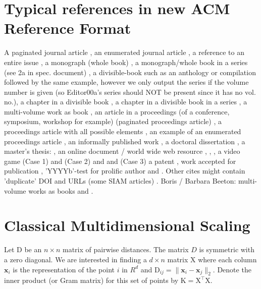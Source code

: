 \documentclass{acmtog} %
\begin{document}

\section{Typical references in new ACM Reference Format}
A paginated journal article \cite{Abril07}, an enumerated
journal article \cite{Cohen07}, a reference to an entire issue \cite{JCohen96},
a monograph (whole book) \cite{Kosiur01}, a monograph/whole book in a series (see 2a in spec. document)
\cite{Harel79}, a divisible-book such as an anthology or compilation \cite{Editor00}
followed by the same example, however we only output the series if the volume number is given
\cite{Editor00a} (so Editor00a's series should NOT be present since it has no vol. no.),
a chapter in a divisible book \cite{Spector90}, a chapter in a divisible book
in a series \cite{Douglass98}, a multi-volume work as book \cite{Knuth97},
an article in a proceedings (of a conference, symposium, workshop for example)
(paginated proceedings article) \cite{Andler79}, a proceedings article
with all possible elements \cite{Smith10}, an example of an enumerated
proceedings article \cite{VanGundy07},
an informally published work \cite{Harel78}, a doctoral dissertation \cite{Clarkson85},
a master's thesis: \cite{anisi03}, an online document / world wide web resource \cite{Thornburg01}, \cite{Ablamowicz07},
\cite{Poker06}, a video game (Case 1) \cite{Obama08} and (Case 2) \cite{Novak03}
and \cite{Lee05} and (Case 3) a patent \cite{JoeScientist001},
work accepted for publication \cite{rous08}, 'YYYYb'-test for prolific author
\cite{SaeediMEJ10} and \cite{SaeediJETC10}. Other cites might contain
'duplicate' DOI and URLs (some SIAM articles) \cite{Kirschmer:2010:AEI:1958016.1958018}.
Boris / Barbara Beeton: multi-volume works as books
\cite{MR781536} and \cite{MR781537}.

\appendix

\section{Classical Multidimensional Scaling}
\label{sec:cmds}

Let $\mathrm{D}$ be an $n\times n$ matrix of pairwise distances. The
matrix $D$ is symmetric with a zero diagonal. We are interested in
finding a $d \times n$ matrix $\mathrm{X}$ where each column
$\bm{x}_{i}$ is the representation of the point $i$ in $R^{d}$ and
$\mathrm{D}_{ij} = \|\bm{x}_{i}-\bm{x}_{j}\|_{2}$. Denote the inner
product (or Gram matrix) for this set of points by $\mathrm{K} =
\mathrm{X}^{\top}\mathrm{X}$.
\end{document}
